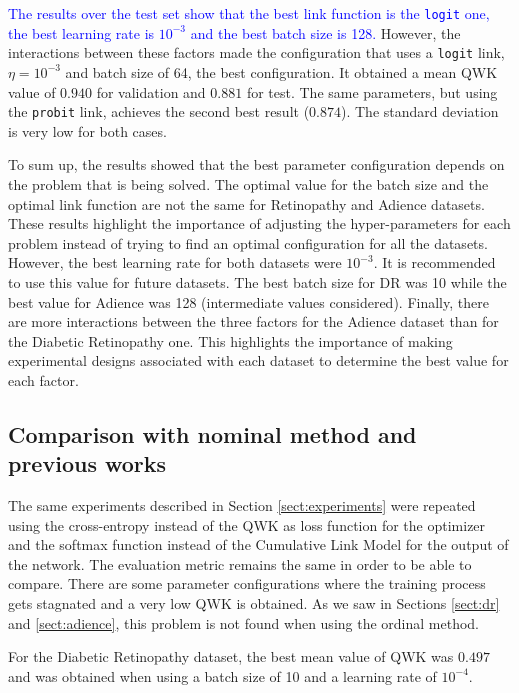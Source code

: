 \documentclass[journal]{IEEEtran}
\begin{document}
	\textcolor{blue}{The results over the test set show that the best link function is the \texttt{logit} one, the best learning rate is $10^{-3}$ and the best batch size is 128.} However, the interactions between these factors made the configuration that uses a \texttt{logit} link, $\eta=10^{-3}$ and batch size of 64, the best configuration. It obtained a mean QWK value of $0.940$ for validation and $0.881$ for test. The same parameters, but using the \texttt{probit} link, achieves the second best result ($0.874$). The standard deviation is very low for both cases.
	
	To sum up, the results showed that the best parameter configuration depends on the problem that is being solved. The optimal value for the batch size and the optimal link function are not the same for Retinopathy and Adience datasets. These results highlight the importance of adjusting the hyper-parameters for each problem instead of trying to find an optimal configuration for all the datasets. However, the best learning rate for both datasets were $10^{-3}$. It is recommended to use this value for future datasets.
	The best batch size for DR was 10 while the best value for Adience was 128 (intermediate values considered).
	Finally, there are more interactions between the three factors for the Adience dataset than for the Diabetic Retinopathy one. This highlights the importance of making experimental designs associated with each dataset to determine the best value for each factor.
	
	\subsection{Comparison with nominal method and previous works}
	\label{sect:NominalComparison}
	
	The same experiments described in Section \ref{sect:experiments} were repeated using the cross-entropy instead of the QWK as loss function for the optimizer and the softmax function instead of the Cumulative Link Model for the output of the network. The evaluation metric remains the same in order to be able to compare. There are some parameter configurations where the training process gets stagnated and a very low QWK is obtained. As we saw in Sections \ref{sect:dr} and \ref{sect:adience}, this problem is not found when using the ordinal method.
	
	For the Diabetic Retinopathy dataset, the best mean value of QWK was $0.497$ and was obtained when using a batch size of 10 and a learning rate of $10^{-4}$.
	
\end{document}

